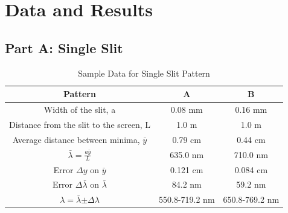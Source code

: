 \documentclass[a4paper,12pt]{report}
\begin{document}
\chapter{Data and Results}
\section{Part A: Single Slit}
\begin{table}[h]
	\begin{center}
\begin{tabular}{|c|c|c|}
	\hline Pattern & A & B \\ 
	\hline Width of the slit, a & 0.08 mm & 0.16 mm \\ 
	\hline Distance from the slit to the screen, L & 1.0 m & 1.0 m \\ 
	\hline Average distance between minima, $\bar{y}$ & 0.79 cm & 0.44 cm \\ 
	\hline $\bar{\lambda}=\frac{a\bar{y}}{L}$ & 635.0 nm & 710.0 nm \\ 
	\hline Error $\Delta y$ on $\bar{y}$ & 0.121 cm & 0.084 cm \\ 
	\hline Error $\Delta \bar{\lambda}$ on $\bar{\lambda}$ & 84.2 nm & 59.2 nm \\ 
	\hline $\lambda=\bar{\lambda}$$\pm$$\Delta\lambda$ & 550.8-719.2 nm & 650.8-769.2 nm \\ 
	\hline 
	\end{tabular} 
 
\end{center}
\caption{Sample Data for Single Slit Pattern}
\end{table}
\end{document}
